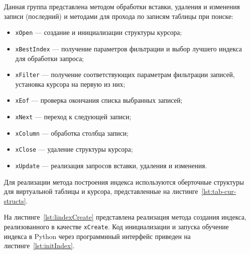 \begin{itemize}
        {
        \captionsetup{format=hang,justification=raggedright,
                      singlelinecheck=off,width=16cm}
        }

        Данная группа представлена методом обработки вставки, удаления и
        изменения записи (последний) и методами для прохода по записям таблицы
        при поиске:
        \begin{itemize}
            \item \texttt{xOpen} --- создание и инициализации структуры курсора;
            \item \texttt{xBestIndex} --- получение параметров фильтрации и
                выбор лучшего индекса для обработки запроса;
            \item \texttt{xFilter} --- получение соответствующих параметрам
                фильтрации записей, установка курсора на первую из них;
            \item \texttt{xEof} --- проверка окончания списка выбранных записей;
            \item \texttt{xNext} --- переход к следующей записи;
            \item \texttt{xColumn} --- обработка столбца записи;
            \item \texttt{xClose} --- удаление структуры курсора;
            \item \texttt{xUpdate} --- реализация запросов вставки, удаления и
                изменения.
        \end{itemize}
\end{itemize}

Для реализации метода построения индекса используются оберточные структуры для
виртуальной таблицы и курсора, представленные на
листинге~\ref{lst:tab-cur-structs}.

{
\captionsetup{format=hang,justification=raggedright,
              singlelinecheck=off,width=16cm}
}

На листинге~\ref{lst:lindexCreate} представлена реализация метода создания
индекса, реализованного в качестве \texttt{xCreate}. Код инициализации и запуска
обучение индекса в Python через программиный интерфейс приведен на
листинге~\ref{lst:initIndex}.

{
\captionsetup{format=hang,justification=raggedright,
              singlelinecheck=off,width=16cm}
}

